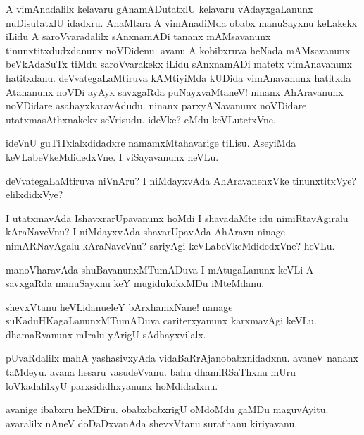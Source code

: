 \begin{mng}
A vimAnadalilx kelavaru gAnamADutatxlU kelavaru vAdayxgaLanunx nuDisutatxlU idadxru. AnaMtara A vimAnadiMda obabx manuSayxnu keLakekx iLidu A saroVvaradalilx sAnxnamADi tananx mAMsavanunx tinunxtitxdudxdanunx noVDidenu. avanu A kobibxruva heNada mAMsavanunx beVkAdaSuTx tiMdu saroVvarakekx iLidu sAnxnamADi matetx vimAnavanunx hatitxdanu. deVvategaLaMtiruva kAMtiyiMda kUDida vimAnavanunx hatitxda Atananunx noVDi ayAyx savxgaRda puNayxvaMtaneV! ninanx AhAravanunx noVDidare asahayxkaravAdudu. ninanx parxyANavanunx noVDidare utatxmasAthxnakekx seVrisudu. ideVke? eMdu keVLutetxVne.
\end{mng}

\begin{mng}
ideVnU guTiTxlalxdidadxre namamxMtahavarige tiLisu. AseyiMda keVLabeVkeMdidedxVne. I viSayavanunx heVLu.
\end{mng}

\begin{mng}
deVvategaLaMtiruva niVnAru? I niMdayxvAda AhAravanenxVke tinunxtitxVye? elilxdidxVye?
\end{mng}

\begin{mng}
I utatxmavAda IshavxrarUpavanunx hoMdi I shavadaMte idu nimiRtavAgiralu kAraNaveVnu? I niMdayxvAda shavarUpavAda AhAravu ninage nimARNavAgalu kAraNaveVnu? sariyAgi keVLabeVkeMdidedxVne? heVLu.
\end{mng}

\begin{mng}
manoVharavAda shuBavanunxMTumADuva I mAtugaLanunx keVLi A savxgaRda manuSayxnu keY mugidukokxMDu iMteMdanu.
\end{mng}

\begin{mng}
shevxVtanu heVLidanu\mdash eleY bArxhamxNane! nanage suKaduHKagaLanunxMTumADuva cariterxyanunx karxmavAgi keVLu. dhamaRvanunx mIralu yArigU sAdhayxvilalx.
\end{mng}

\begin{mng}
pUvaRdalilx mahA yashasivxyAda vidaBaRrAjanobabxnidadxnu. avaneV nananx taMdeyu. avana hesaru vasudeVvanu. bahu dhamiRSaThxnu mUru loVkadalilxyU parxsididhxyanunx hoMdidadxnu.
\end{mng}

\begin{mng}
avanige ibabxru heMDiru. obabxbabxrigU oMdoMdu gaMDu maguvAyitu. avaralilx nAneV doDaDxvanAda shevxVtanu surathanu kiriyavanu.
\end{mng}

